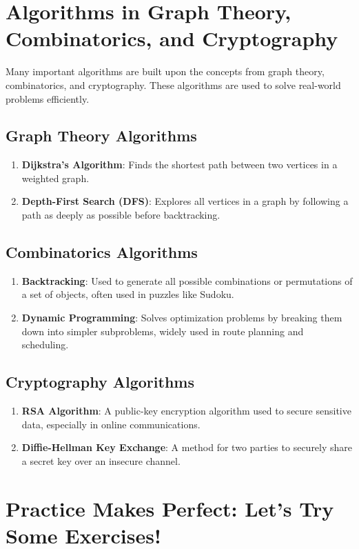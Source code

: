 \section{Algorithms in Graph Theory, Combinatorics, and Cryptography}
Many important algorithms are built upon the concepts from graph theory, combinatorics, and cryptography. These algorithms are used to solve real-world problems efficiently.

\subsection{Graph Theory Algorithms}
\begin{enumerate}
    \item \textbf{Dijkstra’s Algorithm}: Finds the shortest path between two vertices in a weighted graph.
    \item \textbf{Depth-First Search (DFS)}: Explores all vertices in a graph by following a path as deeply as possible before backtracking.
\end{enumerate}

\subsection{Combinatorics Algorithms}
\begin{enumerate}
    \item \textbf{Backtracking}: Used to generate all possible combinations or permutations of a set of objects, often used in puzzles like Sudoku.
    \item \textbf{Dynamic Programming}: Solves optimization problems by breaking them down into simpler subproblems, widely used in route planning and scheduling.
\end{enumerate}

\subsection{Cryptography Algorithms}
\begin{enumerate}
    \item \textbf{RSA Algorithm}: A public-key encryption algorithm used to secure sensitive data, especially in online communications.
    \item \textbf{Diffie-Hellman Key Exchange}: A method for two parties to securely share a secret key over an insecure channel.
\end{enumerate}

\section{Practice Makes Perfect: Let’s Try Some Exercises!}
